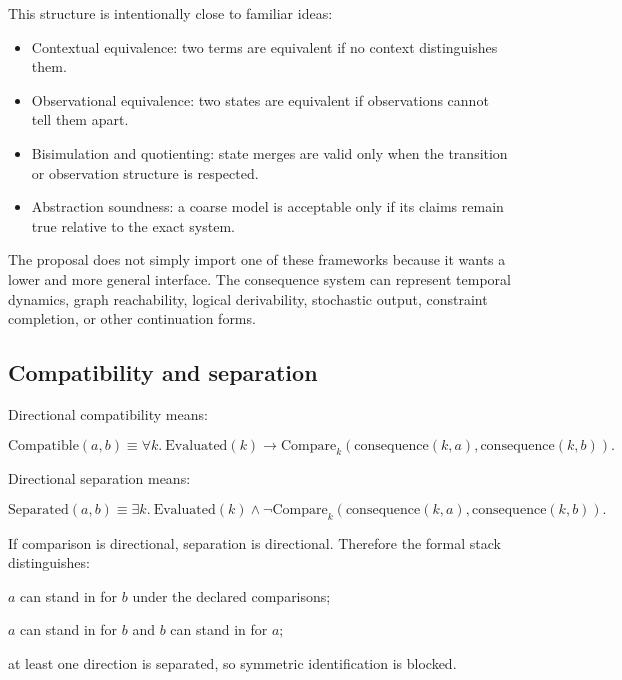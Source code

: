 \documentclass[11pt]{article}
\begin{document}
This structure is intentionally close to familiar ideas:

\begin{itemize}[leftmargin=*]
  \item Contextual equivalence: two terms are equivalent if no context
  distinguishes them.

  \item Observational equivalence: two states are equivalent if observations
  cannot tell them apart.

  \item Bisimulation and quotienting: state merges are valid only when the
  transition or observation structure is respected.

  \item Abstraction soundness: a coarse model is acceptable only if its claims
  remain true relative to the exact system.
\end{itemize}

The proposal does not simply import one of these frameworks because it wants a
lower and more general interface. The consequence system can represent temporal
dynamics, graph reachability, logical derivability, stochastic output,
constraint completion, or other continuation forms.

\subsection{Compatibility and separation}

Directional compatibility means:

\[
\mathrm{Compatible}(a,b) \equiv
\forall k.\ \mathrm{Evaluated}(k) \to
\mathrm{Compare}_k(\mathrm{consequence}(k,a),\mathrm{consequence}(k,b)).
\]

Directional separation means:

\[
\mathrm{Separated}(a,b) \equiv
\exists k.\ \mathrm{Evaluated}(k) \wedge
\neg \mathrm{Compare}_k(\mathrm{consequence}(k,a),\mathrm{consequence}(k,b)).
\]

If comparison is directional, separation is directional. Therefore the formal
stack distinguishes:

\begin{description}[leftmargin=*]
  \item[one-way allowance] \(a\) can stand in for \(b\) under the declared
  comparisons;
  \item[symmetric identification] \(a\) can stand in for \(b\) and \(b\) can
  stand in for \(a\);
  \item[merge separation] at least one direction is separated, so symmetric
  identification is blocked.
\end{description}
\end{document}
